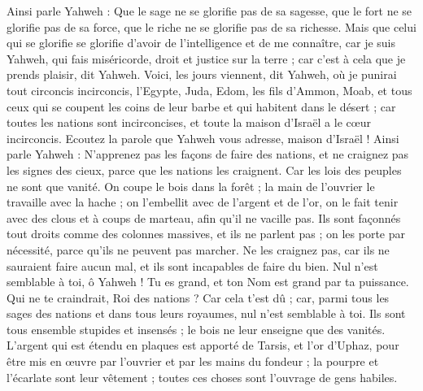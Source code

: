 \begin{multicols}{2}
Ainsi parle Yahweh : Que le sage ne se glorifie pas de sa sagesse, que le fort ne se glorifie pas de sa force, que le riche ne se glorifie pas de sa richesse.
Mais que celui qui se glorifie se glorifie d'avoir de l'intelligence et de me connaître, car je suis Yahweh, qui fais miséricorde, droit et justice sur la terre ; car c'est à cela que je prends plaisir, dit Yahweh.
Voici, les jours viennent, dit Yahweh, où je punirai tout circoncis incirconcis,
l'Egypte, Juda, Edom, les fils d'Ammon, Moab, et tous ceux qui se coupent les coins de leur barbe et qui habitent dans le désert ; car toutes les nations sont incirconcises, et toute la maison d'Israël a le cœur incirconcis.
\VerseOne{}Ecoutez la parole que Yahweh vous adresse, maison d'Israël !
Ainsi parle Yahweh : N'apprenez pas les façons de faire des nations, et ne craignez pas les signes des cieux, parce que les nations les craignent.
Car les lois des peuples ne sont que vanité. On coupe le bois dans la forêt ; la main de l'ouvrier le travaille avec la hache ;
on l'embellit avec de l'argent et de l'or, on le fait tenir avec des clous et à coups de marteau, afin qu'il ne vacille pas.
Ils sont façonnés tout droits comme des colonnes massives, et ils ne parlent pas ; on les porte par nécessité, parce qu'ils ne peuvent pas marcher. Ne les craignez pas, car ils ne sauraient faire aucun mal, et ils sont incapables de faire du bien.
Nul n'est semblable à toi, ô Yahweh ! Tu es grand, et ton Nom est grand par ta puissance.
Qui ne te craindrait, Roi des nations ? Car cela t'est dû ; car, parmi tous les sages des nations et dans tous leurs royaumes, nul n'est semblable à toi.
Ils sont tous ensemble stupides et insensés ; le bois ne leur enseigne que des vanités.
L'argent qui est étendu en plaques est apporté de Tarsis, et l'or d'Uphaz, pour être mis en œuvre par l'ouvrier et par les mains du fondeur ; la pourpre et l'écarlate sont leur vêtement ; toutes ces choses sont l'ouvrage de gens habiles.

\end{multicols}
